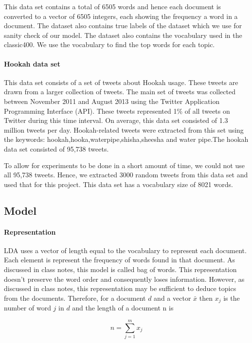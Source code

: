 \documentclass[11pt,a4paper,oneside]{article}
\begin{document}
This data set contains a total of 6505 words and hence each document is converted to a vector of 6505 integers, each showing the frequency a word in a document. The dataset also contains true labels of the dataset which we use for sanity check of our model. The dataset also contains the vocabulary used in the classic400. We use the vocabulary to find the top words for each topic.

\paragraph{Hookah data set}
This data set consists of a set of tweets about Hookah usage. These tweets are drawn from a larger collection of tweets. The main set of tweets was collected between November 2011 and August 2013 using the Twitter Application Programming Interface (API). These tweets represented 1\% of all tweets on Twitter during this time interval. On average, this data set consisted of 1.3 million tweets per day. Hookah-related tweets were extracted from this set using the keywords: hookah,hooka,waterpipe,shisha,sheesha and water pipe.The hookah data set consisted of 95,738 tweets. 

To allow for experiments to be done in a short amount of time, we could not use all 95,738 tweets. Hence, we extracted 3000 random tweets from this data set and used that for this project. This data set has a vocabulary size of 8021 words.

\subsection{Model}
\paragraph{Representation}
LDA uses a vector of length equal to the vocabulary to represent each document. Each element is represent the frequency of words found in that document. As discussed in class notes, this model is called bag of words. This representation doesn't preserve the word order and consequently loses information. However, as discussed in class notes, this representation may be sufficient to deduce topics from the documents. Therefore, for a document $d$ and a vector $\bar{x}$ then $x_j$ is the number of word $j$ in $d$ and the length of a document n is

\begin{equation}
	n = \sum^{m}_{j=1}x_j
\end{equation}
\end{document}
